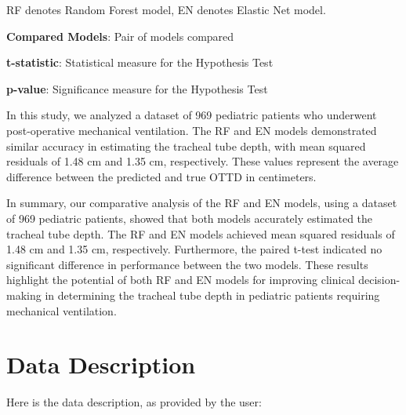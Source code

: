 \documentclass[11pt]{article}
\begin{document}
\begin{table}[h]
\caption{Comparative Performance of the Random Forest and Elastic Net Models}
\label{table:Model_Comparison}
\begin{threeparttable}
\renewcommand{\TPTminimum}{\linewidth}
\begin{tablenotes}
\footnotesize
\item RF denotes Random Forest model, EN denotes Elastic Net model.
\item \textbf{Compared Models}: Pair of models compared
\item \textbf{t-statistic}: Statistical measure for the Hypothesis Test
\item \textbf{p-value}: Significance measure for the Hypothesis Test
\end{tablenotes}
\end{threeparttable}
\end{table}


In this study, we analyzed a dataset of 969 pediatric patients who underwent post-operative mechanical ventilation. The RF and EN models demonstrated similar accuracy in estimating the tracheal tube depth, with mean squared residuals of 1.48 cm and 1.35 cm, respectively. These values represent the average difference between the predicted and true OTTD in centimeters. 

In summary, our comparative analysis of the RF and EN models, using a dataset of 969 pediatric patients, showed that both models accurately estimated the tracheal tube depth. The RF and EN models achieved mean squared residuals of 1.48 cm and 1.35 cm, respectively. Furthermore, the paired t-test indicated no significant difference in performance between the two models. These results highlight the potential of both RF and EN models for improving clinical decision-making in determining the tracheal tube depth in pediatric patients requiring mechanical ventilation.


\clearpage
\appendix

\section{Data Description} \label{sec:data_description} Here is the data description, as provided by the user:
\end{document}
